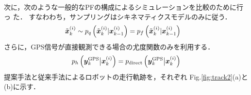 \documentclass[a4paper,10pt,twocolumn,fleqn]{jsarticle}
\def\vec#1{\mbox{\boldmath$#1$}}
\def\vec#1{\mbox{\boldmath$#1$}}
\begin{document}
次に，次のような一般的なPFの構成によるシミュレーションを比較のために行っ
た．
すなわわち，サンプリングはシキネマティクスモデルのみに従う．
\begin{align}
 \tilde{\vec{x}}^{(i)}_k &\sim
p_q\left(\tilde{\vec{x}}^{(i)}_{k} \vert \vec{x}^{(i)}_{k-1}\right)
=  p_f\left(\tilde{\vec{x}}^{(i)}_{k} \vert \vec{x}^{(i)}_{k-1}\right) 
\end{align}
さらに，GPS信号が直接観測できる場合の尤度関数のみを利用する．
\begin{align}
 p_h\left(
 \vec{y}^{\text{GPS}}_k \big \vert \vec{x}^{(i)}_k \right)=
 p_{\text{direct}}\left( \vec{y}^{\text{GPS}}_k \big \vert \vec{x}^{(i)}_k\right)
\end{align}
%
提案手法と従来手法によるロボットの走行軌跡を，それぞれ
Fig.\ref{fig:track2}(a)と(b)に示す．
\end{document}
